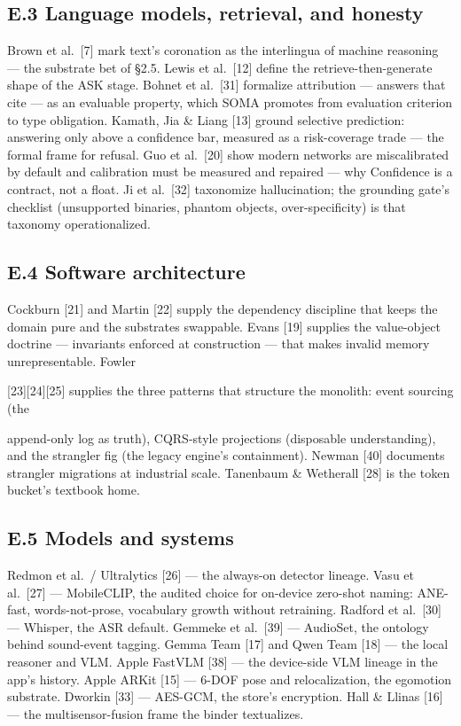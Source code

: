 \subsection{E.3 Language models, retrieval, and honesty}\label{e.3-language-models-retrieval-and-honesty}

Brown et al.~{[}7{]} mark text's coronation as the interlingua of machine reasoning --- the substrate bet of \S{}2.5. Lewis et al.~{[}12{]} define the retrieve-then-generate shape of the ASK stage. Bohnet et al.~{[}31{]} formalize attribution --- answers that cite --- as an evaluable property, which SOMA promotes from evaluation criterion to type obligation. Kamath, Jia \& Liang {[}13{]} ground selective prediction: answering only above a confidence bar, measured as a risk-coverage trade --- the formal frame for refusal. Guo et al.~{[}20{]} show modern networks are miscalibrated by default and calibration must be measured and repaired --- why Confidence is a contract, not a float. Ji et al.~{[}32{]} taxonomize hallucination; the grounding gate's checklist (unsupported binaries, phantom objects, over-specificity) is that taxonomy operationalized.

\subsection{E.4 Software architecture}\label{e.4-software-architecture}

Cockburn {[}21{]} and Martin {[}22{]} supply the dependency discipline that keeps the domain pure and the substrates swappable. Evans {[}19{]} supplies the value-object doctrine --- invariants enforced at construction --- that makes invalid memory unrepresentable. Fowler

{[}23{]}{[}24{]}{[}25{]} supplies the three patterns that structure the monolith: event sourcing (the

append-only log as truth), CQRS-style projections (disposable understanding), and the strangler fig (the legacy engine's containment). Newman {[}40{]} documents strangler migrations at industrial scale. Tanenbaum \& Wetherall {[}28{]} is the token bucket's textbook home.

\subsection{E.5 Models and systems}\label{e.5-models-and-systems}

Redmon et al.~/ Ultralytics {[}26{]} --- the always-on detector lineage. Vasu et al.~{[}27{]} --- MobileCLIP, the audited choice for on-device zero-shot naming: ANE-fast, words-not-prose, vocabulary growth without retraining. Radford et al.~{[}30{]} --- Whisper, the ASR default. Gemmeke et al.~{[}39{]} --- AudioSet, the ontology behind sound-event tagging. Gemma Team {[}17{]} and Qwen Team {[}18{]} --- the local reasoner and VLM. Apple FastVLM {[}38{]} --- the device-side VLM lineage in the app's history. Apple ARKit {[}15{]} --- 6-DOF pose and relocalization, the egomotion substrate. Dworkin {[}33{]} --- AES-GCM, the store's encryption. Hall \& Llinas {[}16{]} --- the multisensor-fusion frame the binder textualizes.

